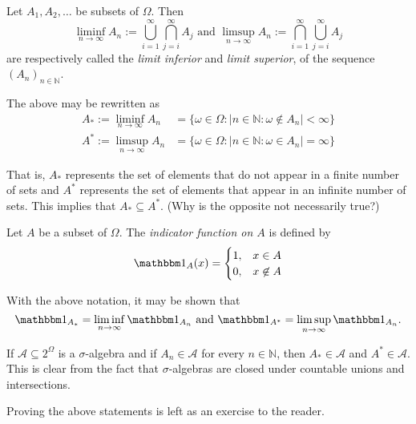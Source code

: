\begin{definition}
\label{defLimes}
    Let $A_1,A_2,\ldots$ be subsets of $\Omega$. Then
    $$\liminf_{n\to\infty}A_n:=\bigcup_{i=1}^\infty\bigcap_{j=i}^\infty A_j\text{ and }\limsup_{n\to\infty}A_n:=\bigcap_{i=1}^\infty\bigcup_{j=i}^\infty A_j$$
    are respectively called the \textit{limit inferior} and \textit{limit superior}, of the sequence $(A_n)_{n\in\mathbb{N}}$.
\end{definition}

The above may be rewritten as
\begin{align*}
    A_*:=\liminf_{n\to\infty}A_n &= \{\omega\in\Omega : |n\in\mathbb{N}:\omega\not\in A_n|<\infty\} \\
    A^*:=\limsup_{n\to\infty}A_n &= \{\omega\in\Omega : |n\in\mathbb{N}:\omega\in A_n|=\infty\}
\end{align*}

That is, $A_*$ represents the set of elements that do not appear in a finite number of sets and $A^*$ represents the set of elements that appear in an infinite number of sets. This implies that $A_*\subseteq A^*$. (Why is the opposite not necessarily true?)

\begin{definition}
    Let $A$ be a subset of $\Omega$. The \textit{indicator function on $A$} is defined by
    $$\indic_A(x)
    =
    \begin{cases}
    1, & x\in A \\
    0, & x\not\in A
    \end{cases}
    $$
\end{definition}

With the above notation, it may be shown that
$$\indic_{A_*}=\liminf_{n\to\infty}\indic_{A_n}\text{ and }\indic_{A^*}=\limsup_{n\to\infty}\indic_{A_n}.$$

If $\mathcal{A}\subseteq2^\Omega$ is a $\sigma$-algebra and if $A_n\in\mathcal{A}$ for every $n\in\mathbb{N}$, then $A_*\in\mathcal{A}$ and $A^*\in\mathcal{A}$. This is clear from the fact that $\sigma$-algebras are closed under countable unions and intersections.

Proving the above statements is left as an exercise to the reader.

